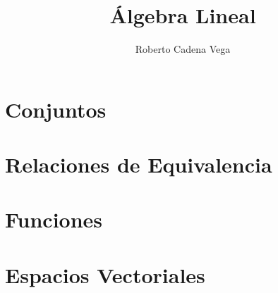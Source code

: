 \documentclass[12pt]{article}
\title{Álgebra Lineal}
\author{Roberto Cadena Vega}
\begin{document}
\maketitle

\newpage
\section{Conjuntos}
\section{Relaciones de Equivalencia}
\section{Funciones}

\newpage
\section{Espacios Vectoriales}
\end{document}
